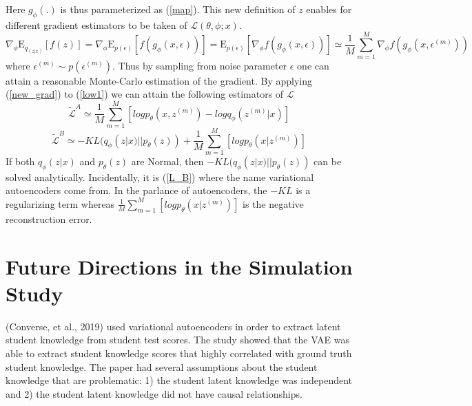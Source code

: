 \documentclass[10pt]{article}
\begin{document}
Here $g_{\phi}(.)$ is thus parameterized as (\ref{map}).  This new definition of $z$ enables for 
different gradient estimators to be taken of $\mathcal{L}(\theta, \phi; x)$.
%
\begin{equation}\label{new_grad}
\nabla_{\phi}\mathrm{E}_{q_(z|x)}[f(z)] = \nabla_{\phi}\mathrm{E}_{p(\epsilon)}[f(g_{\phi}(x,\epsilon))]
= \mathrm{E}_{p(\epsilon)}[\nabla_{\phi}f(g_{\phi}(x,\epsilon))] 
\simeq \frac{1}{M}\sum_{m=1}^{M}\nabla_{\phi}f(g_{\phi}(x,\epsilon^{(m)}))
\end{equation}
where $\epsilon^{(m)} \sim p(\epsilon^{(m)})$.  Thus by sampling from noise parameter $\epsilon$
one can attain a reasonable Monte-Carlo estimation of the gradient.  By applying (\ref{new_grad})
to (\ref{low1}) we can attain the following estimators of $\mathcal{L}$
%
\begin{equation} \label{L_A}
\tilde{\mathcal{L}}^A \simeq \frac{1}{M}\sum_{m=1}^{M}[logp_{\theta}(x,z^{(m)}) - logq_{\phi}(z^{(m)}|x)]
\end{equation}
\begin{equation} \label{L_B}
\tilde{\mathcal{L}}^B \simeq -KL(q_{\phi}(z|x)||p_{\theta}(z)) +
\frac{1}{M}\sum_{m=1}^{M}[logp_{\theta}(x|z^{(m)})]
\end{equation}
%
%
If both $q_{\phi}(z|x)$ and $p_{\theta}(z)$ are Normal, then $-KL(q_{\phi}(z|x)||p_{\theta}(z))$ 
can be solved analytically. Incidentally, it is (\ref{L_B}) where the name variational
autoencoders come from.  In the parlance of autoencoders, the $-KL$ is a regularizing
term whereas $\frac{1}{M}\sum_{m=1}^{M}[logp_{\theta}(x|z^{(m)})]$ is the negative
reconstruction error.


\section*{Future Directions in the Simulation Study}
(Converse, et al., 2019) used variational autoencoders in order to extract latent student knowledge from student test scores.  The study showed that the VAE was able to extract student knowledge scores that highly correlated with ground truth student knowledge.  The paper had several assumptions about the student knowledge that are problematic:
1) the student latent knowledge was independent and 
2) the student latent knowledge did not have causal relationships.
\end{document}
